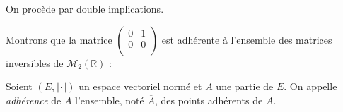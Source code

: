 \documentclass[a4paper,10pt]{report}
\begin{document}
\begin{preuve} On procède par double implications.
%
%
%

\vspace{10cm}
\end{preuve}



\begin{ex} Montrons que la matrice $\begin{pmatrix}
0 & 1 \\
0 & 0 \\
\end{pmatrix}$ est adhérente à l'ensemble des matrices inversibles de $\mathcal{M}_2(\mathbb{R})$ :

\vspace{3cm}
%
\end{ex}

\begin{defin} Soient $(E, \Vert \cdot \Vert)$ un espace vectoriel normé et $A$ une partie de $E$. On appelle \textit{adhérence} de $A$ l'ensemble, noté $\overline{A}$, des points adhérents de $A$.
\end{defin}
\end{document}
